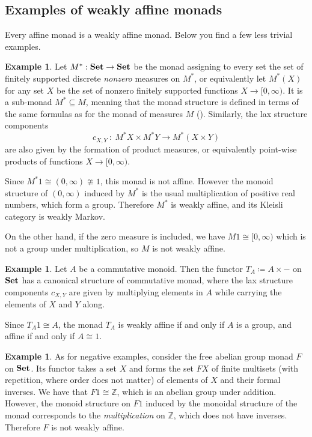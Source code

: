 \documentclass[a4paper,UKenglish,numberwithinsect,cleveref, autoref, thm-restate]{lipics-v2021}
\theoremstyle{plain} %
\theoremstyle{definition} %
\newtheorem{myexample}[mytheorem]{Example}
\begin{document}
\subsection{Examples of weakly affine monads} 
\label{secexamples}

Every affine monad is a weakly affine monad. Below you find a few less trivial examples.

\begin{myexample}
    \label{ex:nonzero_measures}
	Let $M^* : \mathbf{Set} \to \mathbf{Set}$ be the monad assigning to every set the set of finitely supported discrete \emph{nonzero}
	measures on $M^*$, or equivalently let $M^*(X)$ for any set $X$ be the set of nonzero finitely supported functions $X \to [0,\infty)$.
	It is a sub-monad $M^* \subseteq M$, meaning that the monad structure is defined in terms of the same formulas as for the monad of measures $M$ ().
	Similarly, the lax structure components
	\[
		c_{X,Y} \: : \: M^* X \times M^* Y \longrightarrow M^*(X \times Y)
	\]
	are also given by the formation of product measures, or equivalently point-wise products of functions 
	$X \to [0,\infty)$.

	Since $M^* 1 \cong (0,\infty)\ncong 1$, this monad is not affine. However the monoid structure of $(0,\infty)$ induced by $M^*$ is the usual multiplication of positive real numbers, which form a group. Therefore $M^*$ is weakly affine, and its Kleisli category is weakly Markov.

	On the other hand, if the zero measure is included, we have $M1 \cong [0,\infty)$ which is not a group under multiplication, so $M$ is not weakly affine.
\end{myexample}

\begin{myexample}
	\label{ex:abelian_group}
	Let $A$ be a commutative monoid.
	Then the functor $T_A \coloneqq A \times -$ on $\mathbf{Set}$ has a canonical structure of commutative monad, 
	where the lax structure components $c_{X,Y}$ are given by multiplying elements in $A$ while carrying the elements 
	of $X$ and $Y$ along.

	Since $T_A 1 \cong A$, the monad $T_A$ is weakly affine if and only if $A$ is a group, and affine if and only if $A\cong 1$.
\end{myexample}

\begin{myexample}
    \label{ex:nonexample}
    As for negative examples,
    consider the free abelian group monad $F$ on $\mathbf{Set}$. Its functor takes a set $X$ and forms the set $FX$ of finite multisets (with repetition, where order does not matter) of elements of $X$ and their formal inverses. 
    We have that $F1\cong \mathbb{Z}$, which is an abelian group under addition. 
    However, the monoid structure on $F1$ induced by the monoidal structure of the monad corresponds to the \emph{multiplication} on $\mathbb{Z}$, which does not have inverses. Therefore $F$ is not weakly affine. 
\end{myexample}
\end{document}
